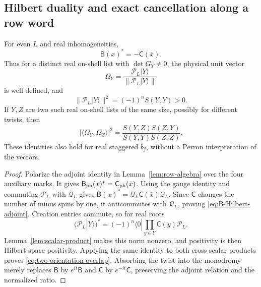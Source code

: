 \subsection{Hilbert duality and exact cancellation along a row word}

\begin{lemma}\label{lem:hilbert-dual}
For even $L$ and real inhomogeneities,
\begin{equation}\label{eq:B-Hilbert-adjoint}
 \mathsf B(x)^*=-\mathsf C(\bar x).
\end{equation}
Thus for a distinct real on-shell list with $\det G_Y\ne0$, the
physical unit vector
\begin{equation}\label{eq:physical-Bethe-vector}
 \Omega_Y=\frac{\mathcal P_L|Y\rangle}{\|\mathcal P_L|Y\rangle\|}
\end{equation}
is well defined, and
\[
 \|\mathcal P_L|Y\rangle\|^2=(-1)^nS(Y,Y)>0.
\]
If $Y,Z$ are two such real on-shell lists of the same size, possibly
for different twists, then
\begin{equation}\label{eq:two-orientation-overlap}
 |\langle\Omega_Y,\Omega_Z\rangle|^2
       =\frac{S(Y,Z)S(Z,Y)}{S(Y,Y)S(Z,Z)}.
\end{equation}
These identities also hold for real staggered $b_j$, without a Perron
interpretation of the vectors.
\end{lemma}

\begin{proof}
Polarize the adjoint identity in Lemma~\ref{lem:row-algebra} over the
four auxiliary marks.  It gives
$\mathsf B_{\rm ph}(x)^*=\mathsf C_{\rm ph}(\bar x)$.
Using the gauge identity and commuting $\mathcal P_L$ with
$\mathcal Q_L$ gives
$\mathsf B(x)^*=\mathcal Q_L\mathsf C(\bar x)\mathcal Q_L$.
Since $\mathsf C$ changes the number of minus spins by one, it
anticommutes with $\mathcal Q_L$, proving
\eqref{eq:B-Hilbert-adjoint}.  Creation entries commute, so for real
roots
\[
 (\mathcal P_L|Y\rangle)^*
       =(-1)^n\langle0|\prod_{y\in Y}\mathsf C(y)\mathcal P_L.
\]
Lemma~\ref{lem:scalar-product} makes this norm nonzero, and positivity
is then Hilbert-space positivity.  Applying the same identity to both
cross scalar products proves \eqref{eq:two-orientation-overlap}.
Absorbing the twist into the monodromy merely replaces
$\mathsf B$ by $e^{it}\mathsf B$ and $\mathsf C$ by
$e^{-it}\mathsf C$, preserving the adjoint relation and the normalized
ratio.
\end{proof}

